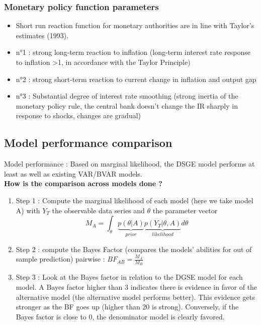\documentclass{article}
\begin{document}
\subsubsection{Monetary policy function parameters}
\begin{itemize}
    \item Short run reaction function for monetary authorities are in line with Taylor's estimates (1993). 
    \item n°1 : strong long-term reaction to inflation (long-term interest rate response to inflation >1, in accordance with the Taylor Principle)
    \item n°2 : strong short-term reaction to current change in inflation and output gap
    \item n°3 : Substantial degree of interest rate smoothing (strong inertia of the monetary policy rule, the central bank doesn't change the IR sharply in response  to shocks, changes are gradual)
\end{itemize}


\subsection{Model performance comparison}
Model performance : Based on marginal likelihood, the DSGE model performs at least as well as existing VAR/BVAR models.\\ 
\textbf{How is the comparison across models done ?}
\begin{enumerate}
    \item Step 1 : Compute the marginal likelihood of each model (here we take model A) with $Y_T$ the observable data series and $\theta$ the parameter vector
    \begin{equation}
        M_A = \int_\theta \underbrace{p(\theta|A)}_{prior}\underbrace{p(Y_T|\theta,A)}_{likelihood}d\theta
    \end{equation}
    \item Step 2 : compute the Bayes Factor (compares the models' abilities for out of sample prediction) pairwise : $BF_{AB} = \frac{M_A}{M_B}$
    \item Step 3 : Look at the Bayes factor in relation to the DGSE model for each model. A Bayes factor higher than 3 indicates there is evidence in favor of the alternative model (the alternative model performs better). This evidence gets stronger as the BF goes up (higher than 20 is  strong). Conversely, if the Bayes factor is close to 0, the denominator model is clearly favored. 
\end{enumerate}
\end{document}
